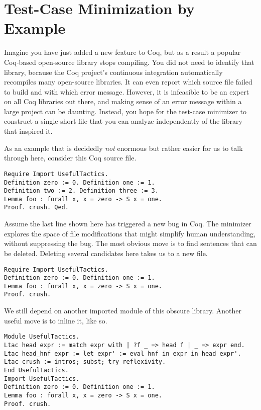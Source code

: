 \documentclass[a4paper,USenglish,cleveref,autoref,thm-restate]{lipics-v2021}
\begin{document}
\section{Test-Case Minimization by Example}\label{sec:example}

Imagine you have just added a new feature to Coq, but as a result a popular Coq-based open-source library stops compiling.
You did not need to identify that library, because the Coq project's continuous integration automatically recompiles many open-source libraries.
It can even report which source file failed to build and with which error message.
However, it is infeasible to be an expert on all Coq libraries out there, and making sense of an error message within a large project can be daunting.
Instead, you hope for the test-case minimizer to construct a single short file that you can analyze independently of the library that inspired it.

As an example that is decidedly \emph{not} enormous but rather easier for us to talk through here, consider this Coq source file.
\begin{verbatim}
Require Import UsefulTactics.
Definition zero := 0. Definition one := 1.
Definition two := 2. Definition three := 3.
Lemma foo : forall x, x = zero -> S x = one.
Proof. crush. Qed.
\end{verbatim}

Assume the last line shown here has triggered a new bug in Coq.
The minimizer explores the space of file modifications that might simplify human understanding, without suppressing the bug.
The most obvious move is to find sentences that can be deleted.
Deleting several candidates here takes us to a new file.
\begin{verbatim}
Require Import UsefulTactics.
Definition zero := 0. Definition one := 1.
Lemma foo : forall x, x = zero -> S x = one.
Proof. crush.
\end{verbatim}

We still depend on another imported module of this obscure library.
Another useful move is to inline it, like so.
\begin{verbatim}
Module UsefulTactics.
Ltac head expr := match expr with | ?f _ => head f | _ => expr end.
Ltac head_hnf expr := let expr' := eval hnf in expr in head expr'.
Ltac crush := intros; subst; try reflexivity.
End UsefulTactics.
Import UsefulTactics.
Definition zero := 0. Definition one := 1.
Lemma foo : forall x, x = zero -> S x = one.
Proof. crush.
\end{verbatim}
\end{document}
